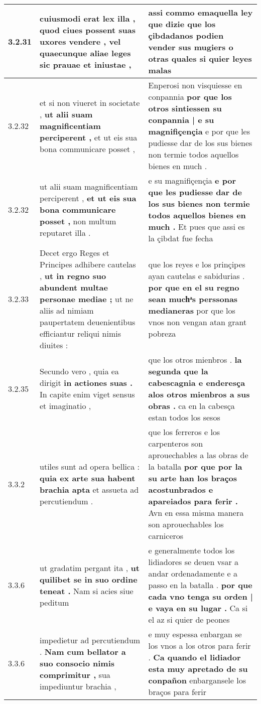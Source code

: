 \begin{tabular}{|p{1cm}|p{6.5cm}|p{6.5cm}|}
3.2.31 & cuiusmodi erat lex illa , \textbf{ quod ciues possent suas uxores vendere , } vel quaecunque aliae leges sic prauae et iniustae , & assi commo emaquella ley que dizie \textbf{ que los çibdadanos podien vender sus mugiers } o otras quales si quier leyes malas \\\hline
3.2.32 & et si non viueret in societate , \textbf{ ut alii suam magnificentiam perciperent , } et ut eis sua bona communicare posset , & Enperosi non visquiesse en conpannia \textbf{ por que los otros sintiessen su conpannia | e su magnifiçençia } e por que les pudiesse dar de los sus bienes non termie todos aquellos bienes en much . \\\hline
3.2.32 & ut alii suam magnificentiam perciperent , \textbf{ et ut eis sua bona communicare posset , } non multum reputaret illa . & e su magnifiçençia \textbf{ e por que les pudiesse dar de los sus bienes non termie todos aquellos bienes en much . } Et pues que assi es la çibdat fue fecha \\\hline
3.2.33 & Decet ergo Reges et Principes adhibere cautelas , \textbf{ ut in regno suo abundent multae personae mediae ; } ut ne aliis ad nimiam paupertatem deuenientibus efficiantur reliqui nimis diuites : & que los reyes e los prinçipes ayan cautelas e sabidurias . \textbf{ por que en el su regno sean muchͣs perssonas medianeras } por que los vnos non vengan atan grant pobreza \\\hline
3.2.35 & Secundo vero , quia ea dirigit \textbf{ in actiones suas . } In capite enim viget sensus et imaginatio , & que los otros mienbros . \textbf{ la segunda que la cabescagnia e enderesça alos otros mienbros a sus obras . } ca en la cabesça estan todos los sesos \\\hline
3.3.2 & utiles sunt ad opera bellica : \textbf{ quia ex arte sua habent brachia apta } et assueta ad percutiendum . & que los ferreros e los carpenteros son aprouechables a las obras de la batalla \textbf{ por que por la su arte han los braços acostunbrados e apareiados para ferir . } Avn en essa misma manera son aprouechables los carniceros \\\hline
3.3.6 & ut gradatim pergant ita , \textbf{ ut quilibet se in suo ordine teneat . } Nam si acies siue peditum & e generalmente todos los lidiadores se deuen vsar a andar ordenadamente e a passo en la batalla . \textbf{ por que cada vno tenga su orden | e vaya en su lugar . } Ca si el az si quier de peones \\\hline
3.3.6 & impedietur ad percutiendum . \textbf{ Nam cum bellator a suo consocio nimis comprimitur , } sua impediuntur brachia , & e muy espessa enbargan se los vnos a los otros para ferir . \textbf{ Ca quando el lidiador esta muy apretado de su conpañon } enbargansele los braços para ferir \\\hline

\end{tabular}
